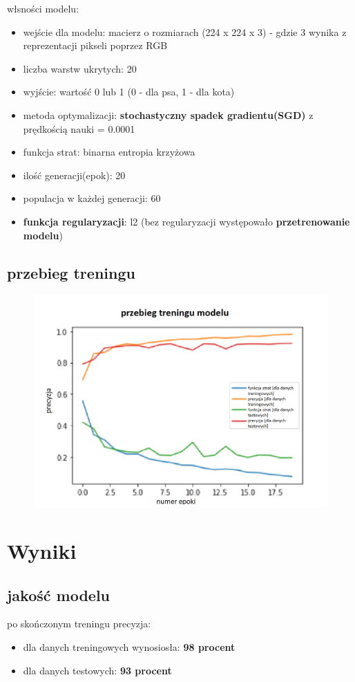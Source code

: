 \documentclass[a4paper,12pt]{scrartcl}
\begin{document}
włsności modelu:
\begin{itemize}
  \item wejście dla modelu: macierz o rozmiarach (224 x 224 x 3) - gdzie 3 wynika z reprezentacji pikseli poprzez RGB 
  \item liczba warstw ukrytych: 20 
  \item wyjście: wartość 0 lub 1 (0 - dla psa, 1 - dla kota) 
  \item metoda optymalizacji:  \textbf{stochastyczny spadek gradientu(SGD)} z prędkością nauki = 0.0001
  \item funkcja strat:  binarna entropia krzyżowa
  \item ilość generacji(epok):  20
  \item populacja w każdej generacji: 60
  \item \textbf{funkcja regularyzacji}: l2 (bez regularyzacji występowało \textbf{przetrenowanie modelu})
\end{itemize}  

\subsection{przebieg treningu}

\begin{figure}[h]
  \includegraphics[width=\linewidth]{TRENINNG.png}
\end{figure}
\newpage{}
\section{Wyniki}
\subsection{jakość modelu}
po skończonym treningu precyzja:
\begin{itemize}
  \item dla danych treningowych wynosiosła: \textbf{98 procent}
  \item dla danych testowych: \textbf{93 procent}

\end{itemize}  
\end{document}
